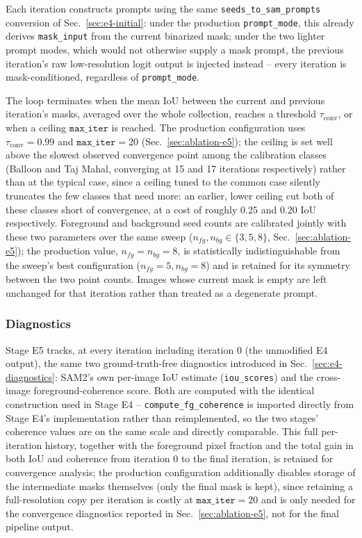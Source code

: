 Each iteration constructs prompts using the same \texttt{seeds\_to\_sam\_prompts} conversion of Sec.~\ref{sec:e4-initial}: under the production \texttt{prompt\_mode}, this already derives \texttt{mask\_input} from the current binarized mask; under the two lighter prompt modes, which would not otherwise supply a mask prompt, the previous iteration's raw low-resolution logit output is injected instead -- every iteration is mask-conditioned, regardless of \texttt{prompt\_mode}.

The loop terminates when the mean IoU between the current and previous
iteration's masks, averaged over the whole collection, reaches a
threshold $\tau_{\text{conv}}$, or when a ceiling $\texttt{max\_iter}$
is reached. The production configuration uses $\tau_{\text{conv}}=0.99$ and $\texttt{max\_iter}=20$ (Sec.~\ref{sec:ablation-e5}); the ceiling is set well above the slowest observed convergence point among the calibration classes (Balloon and Taj Mahal, converging at 15 and 17 iterations respectively) rather than at the typical case, since a ceiling tuned to the common case silently truncates the few classes that need more: an earlier, lower ceiling cut both of these classes short of convergence, at a cost of roughly $0.25$ and $0.20$ IoU respectively. Foreground and background seed counts are calibrated jointly with these two parameters over the same sweep ($n_{fg}, n_{bg} \in \{3,5,8\}$, Sec.~\ref{sec:ablation-e5}); the production value, $n_{fg}=n_{bg}=8$, is statistically indistinguishable from the sweep's best configuration ($n_{fg}=5, n_{bg}=8$) and is retained for its symmetry between the two point counts. Images whose current mask is empty are left unchanged for that iteration rather than treated as a degenerate prompt.

\subsubsection{Diagnostics}
\label{sec:e5-diagnostics}

Stage E5 tracks, at every iteration including iteration $0$ (the
unmodified E4 output), the same two ground-truth-free diagnostics
introduced in Sec.~\ref{sec:e4-diagnostics}: SAM2's own per-image IoU
estimate (\texttt{iou\_scores}) and the cross-image foreground-coherence
score. Both are computed with the identical construction used in Stage
E4 -- \texttt{compute\_fg\_coherence} is imported directly from Stage
E4's implementation rather than reimplemented, so the two stages'
coherence values are on the same scale and directly comparable. This
full per-iteration history, together with the foreground pixel
fraction and the total gain in both IoU and coherence from iteration
$0$ to the final iteration, is retained for convergence analysis; the
production configuration additionally disables storage of the
intermediate masks themselves (only the final mask is kept), since
retaining a full-resolution copy per iteration is costly at
$\texttt{max\_iter}=20$ and is only needed for the convergence
diagnostics reported in Sec.~\ref{sec:ablation-e5}, not for the final
pipeline output.